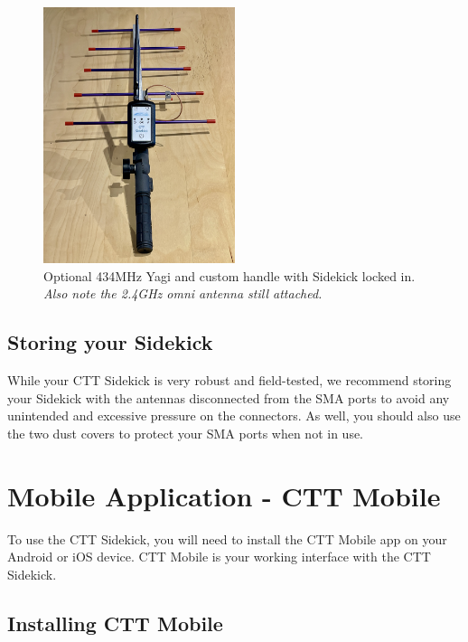 \documentclass[
]{article}
\begin{document}
\begin{figure}
\hypertarget{id}{%
\centering
\includegraphics[width=0.5\textwidth,height=\textheight]{./images/sidekick_434MHzYagi.JPG}
\caption{Optional 434MHz Yagi and custom handle with Sidekick locked in.
\emph{Also note the 2.4GHz omni antenna still attached.}}\label{id}
}
\end{figure}

\hypertarget{storing-your-sidekick}{%
\subsection{Storing your Sidekick}\label{storing-your-sidekick}}

While your CTT Sidekick is very robust and field-tested, we recommend
storing your Sidekick with the antennas disconnected from the SMA ports
to avoid any unintended and excessive pressure on the connectors. As
well, you should also use the two dust covers to protect your SMA ports
when not in use.

\hypertarget{mobile-application---ctt-mobile}{%
\section{Mobile Application - CTT
Mobile}\label{mobile-application---ctt-mobile}}

To use the CTT Sidekick, you will need to install the CTT Mobile app on
your Android or iOS device. CTT Mobile is your working interface with
the CTT Sidekick.

\hypertarget{installing-ctt-mobile}{%
\subsection{Installing CTT Mobile}\label{installing-ctt-mobile}}
\end{document}
